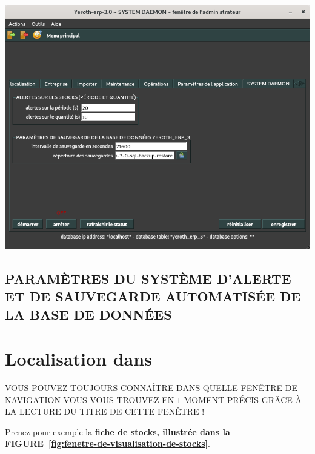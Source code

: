 \begin{center}
\includegraphics[scale=0.52]{images/yeroth-erp-3-0-system-daemon-parameters.png}
\label{fig:fenetre-de-visualisation-de-stocks}
\end{center}


\newpage


\subsection{PARAMÈTRES DU SYSTÈME D'ALERTE ET DE SAUVEGARDE AUTOMATISÉE DE LA
			BASE DE DONNÉES}


\newpage


\section{Localisation dans \yerotherpblack}

VOUS POUVEZ TOUJOURS CONNAÎTRE DANS QUELLE FEN\^ETRE
DE NAVIGATION VOUS VOUS TROUVEZ EN $1$ MOMENT PR\'ECIS
GRÂCE \`A LA LECTURE DU TITRE DE CETTE FEN\^ETRE !

Prenez pour exemple la \textbf{fiche de stocks, illustr\'ee
dans la FIGURE~\ref{fig:fenetre-de-visualisation-de-stocks}}.





